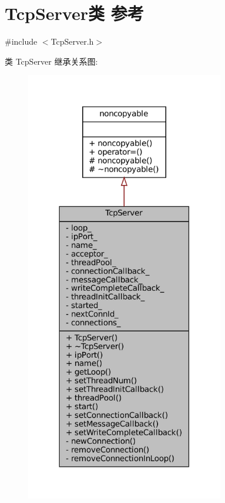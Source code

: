 \hypertarget{classmuduo_1_1net_1_1TcpServer}{}\section{Tcp\+Server类 参考}
\label{classmuduo_1_1net_1_1TcpServer}


{\ttfamily \#include $<$Tcp\+Server.\+h$>$}



类 Tcp\+Server 继承关系图\+:
\nopagebreak
\begin{figure}[H]
\begin{center}
\leavevmode
\includegraphics[width=245pt]{classmuduo_1_1net_1_1TcpServer__inherit__graph}
\end{center}
\end{figure}


